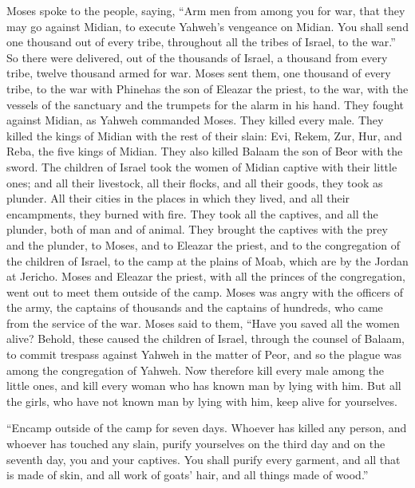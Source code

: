  Moses spoke to the people, saying, ``Arm men from among
you for war, that they may go against Midian, to execute Yahweh's
vengeance on Midian.  You shall send one thousand out of
every tribe, throughout all the tribes of Israel, to the war.''
 So there were delivered, out of the thousands of Israel,
a thousand from every tribe, twelve thousand armed for war.
 Moses sent them, one thousand of every tribe, to the war
with Phinehas the son of Eleazar the priest, to the war, with the
vessels of the sanctuary and the trumpets for the alarm in his hand.
 They fought against Midian, as Yahweh commanded Moses.
They killed every male.  They killed the kings of Midian
with the rest of their slain: Evi, Rekem, Zur, Hur, and Reba, the five
kings of Midian. They also killed Balaam the son of Beor with the sword.
 The children of Israel took the women of Midian captive
with their little ones; and all their livestock, all their flocks, and
all their goods, they took as plunder.  All their cities
in the places in which they lived, and all their encampments, they
burned with fire.  They took all the captives, and all
the plunder, both of man and of animal.  They brought the
captives with the prey and the plunder, to Moses, and to Eleazar the
priest, and to the congregation of the children of Israel, to the camp
at the plains of Moab, which are by the Jordan at Jericho.
 Moses and Eleazar the priest, with all the princes of
the congregation, went out to meet them outside of the camp.
 Moses was angry with the officers of the army, the
captains of thousands and the captains of hundreds, who came from the
service of the war.  Moses said to them, ``Have you saved
all the women alive?  Behold, these caused the children
of Israel, through the counsel of Balaam, to commit trespass against
Yahweh in the matter of Peor, and so the plague was among the
congregation of Yahweh.  Now therefore kill every male
among the little ones, and kill every woman who has known man by lying
with him.  But all the girls, who have not known man by
lying with him, keep alive for yourselves.

 ``Encamp outside of the camp for seven days. Whoever has
killed any person, and whoever has touched any slain, purify yourselves
on the third day and on the seventh day, you and your captives.
 You shall purify every garment, and all that is made of
skin, and all work of goats' hair, and all things made of wood.''

